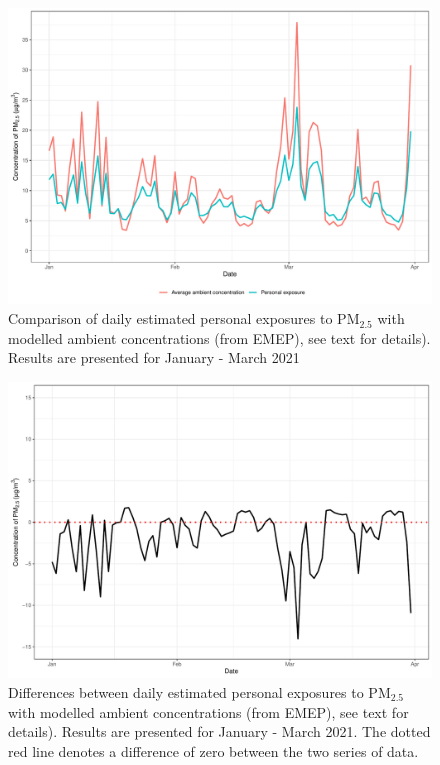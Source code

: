 \documentclass{article}
\begin{document}
\begin{figure}[!hbtp]
	\centering
	\includegraphics[width=0.85\linewidth]{Figures/Fig2b}		
	\caption{Comparison of daily estimated personal exposures to PM$_{2.5}$ with modelled ambient concentrations (from EMEP), see text for details). Results are presented for January - March 2021} \label{fig::Fig2b}
\end{figure}

\begin{figure}[!hbtp]
	\centering
	\includegraphics[width=0.85\linewidth]{Figures/Fig2b_diff}		
	\caption{Differences between daily estimated personal exposures to PM$_{2.5}$ with modelled ambient concentrations (from EMEP), see text for details). Results are presented for January - March 2021. The dotted red line denotes a difference of zero between the two series of data. } \label{fig::Fig2b_diff}
\end{figure}
\end{document}
